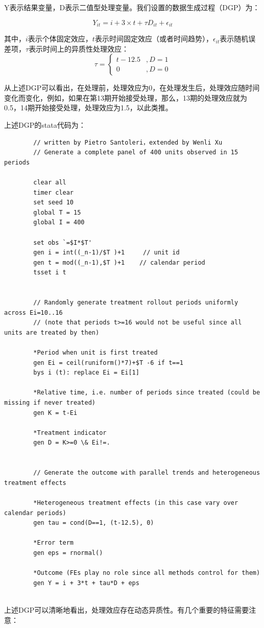 \documentclass[cn,12pt,math=newtx,citestyle=gb7714-2015,bibstyle=gb7714-2015]{elegantbook}
\begin{document}
	Y表示结果变量，D表示二值型处理变量。我们设置的数据生成过程（DGP）为：
	
	$$Y_{it}=i+3 \times t +\tau D_{it} +\epsilon_{it}$$
	
	其中，$i$表示个体固定效应，$t$表示时间固定效应（或者时间趋势），$\epsilon_{it}$表示随机误差项，$\tau$表示时间上的异质性处理效应：
	$$	\tau = 
	\begin{cases}
		t-12.5 &, D=1 \\
		0&, D=0
	\end{cases} $$
	
	从上述DGP可以看出，在处理前，处理效应为0，在处理发生后，处理效应随时间变化而变化，例如，如果在第13期开始接受处理，那么，13期的处理效应就为0.5，14期开始接受处理，处理效应为1.5，以此类推。
	
	上述DGP的stata代码为：
	
	\begin{lstlisting}
		// written by Pietro Santoleri，extended by Wenli Xu
		// Generate a complete panel of 400 units observed in 15 periods
		
		clear all
		timer clear
		set seed 10
		global T = 15
		global I = 400
		
		set obs `=$I*$T'
		gen i = int((_n-1)/$T )+1     // unit id
		gen t = mod((_n-1),$T )+1    // calendar period
		tsset i t
		
		
		// Randomly generate treatment rollout periods uniformly across Ei=10..16
		// (note that periods t>=16 would not be useful since all units are treated by then)
		
		*Period when unit is first treated
		gen Ei = ceil(runiform()*7)+$T -6 if t==1
		bys i (t): replace Ei = Ei[1]
		
		*Relative time, i.e. number of periods since treated (could be missing if never treated)
		gen K = t-Ei
		
		*Treatment indicator
		gen D = K>=0 \& Ei!=.
		
		
		// Generate the outcome with parallel trends and heterogeneous treatment effects
		
		*Heterogeneous treatment effects (in this case vary over calendar periods)
		gen tau = cond(D==1, (t-12.5), 0)
		
		*Error term
		gen eps = rnormal()
		
		*Outcome (FEs play no role since all methods control for them)
		gen Y = i + 3*t + tau*D + eps
		
	\end{lstlisting}
	
	上述DGP可以清晰地看出，处理效应存在动态异质性。有几个重要的特征需要注意：
	
\end{document}
